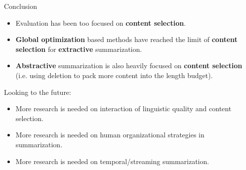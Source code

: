 \documentclass[xcolor={table}]{beamer}
\begin{document}
\begin{frame}{Conclusion}
   
    \begin{itemize}
            \small
        \item Evaluation has been too focused on \textbf{content selection}.
        \item \textbf{Global optimization} based methods have reached the limit
            of \textbf{content selection} for \textbf{extractive} 
            summarization.
        
        \item \textbf{Abstractive} summarization is also heavily focused on 
            \textbf{content
            selection} (i.e. using deletion to pack more content into
            the length budget).
    \end{itemize}

    Looking to the future:    
    \begin{itemize}
            \small
     \item More research is needed on interaction of linguistic quality
         and content selection.
        \item More research is needed on human organizational strategies in 
            summarization.
        \item More research is needed on temporal/streaming summarization.
     
    \end{itemize}

\end{frame}
\end{document}
